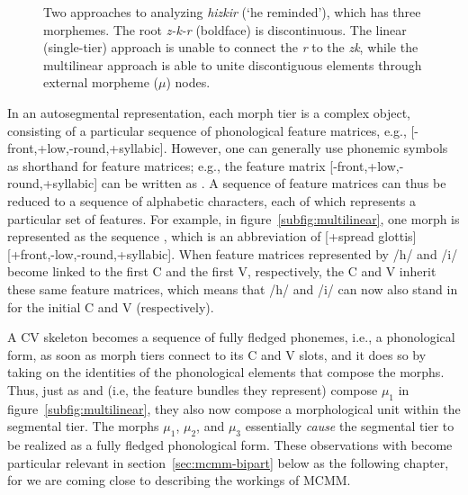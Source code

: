 \begin{figure}
{
	\label{subfig:linear}
	}
\caption{Two approaches to analyzing \textit{hizkir} (`he reminded'), which has three morphemes. 
The root \textit{z-k-r} (boldface) is discontinuous. The linear (single-tier) approach is unable to connect the \textit{r} to the \textit{zk}, while the multilinear approach is able to unite discontiguous elements through external morpheme ($\mu$) nodes.}
\label{fig:approaches}
\end{figure}

In an autosegmental representation, each morph tier is a complex object, consisting of a particular sequence of phonological feature matrices, e.g., [-front,+low,-round,+syllabic]. However, one can generally use phonemic symbols as shorthand for
feature matrices; e.g., the feature matrix [-front,+low,-round,+syllabic] can be written as . A sequence of feature matrices can thus be reduced to a sequence of alphabetic characters, each of which represents a particular set of features. For example, in figure~\ref{subfig:multilinear}, one morph is represented as the sequence , which is an abbreviation of \textipa{/}[+spread glottis][+front,-low,-round,+syllabic]\textipa{/}.
When feature matrices represented by /h/ and /i/ become linked to the first C and the first V, respectively, the C and V inherit these same feature matrices, which means that /h/ and /i/ can now also stand in for the initial C and V (respectively). 

A CV skeleton becomes a sequence of fully fledged phonemes, i.e., a phonological
form, as soon as morph tiers connect to its C and V slots, and it does so by taking 
on the identities of the phonological elements that compose the morphs. 
Thus, just as  and  (i.e, the feature bundles they represent) compose 
$\mu_1$ in figure~\ref{subfig:multilinear}, they also now compose a morphological 
unit within the segmental tier. The morphs $\mu_1$, $\mu_2$, and $\mu_3$ 
essentially \emph{cause} the segmental tier to be realized as a fully fledged 
phonological form. These observations with become particular relevant in section~\ref{sec:mcmm-bipart} 
below as the following chapter, for we are coming close to describing the workings 
of \ac{MCMM}. 

